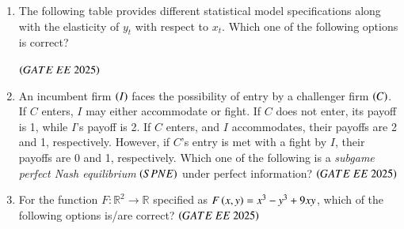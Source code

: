 \documentclass[journal,12pt,onecolumn]{IEEEtran}
\theoremstyle{remark}
\begin{document}
\begin{enumerate}
\item The following table provides different statistical model specifications along with the elasticity of $y_t$ with respect to $x_t$. Which one of the following options is correct?

\begin{center}

\end{center}
\hfill $\left(GATE\ EE\ 2025\right)$
\begin{enumerate}
\end{enumerate}
 
\item An incumbent firm $\left(I\right)$ faces the possibility of entry by a challenger firm $\left(C\right)$. If $C$ enters, $I$ may either accommodate or fight. If $C$ does not enter, its payoff is 1, while $I$'s payoff is 2. If $C$ enters, and $I$ accommodates, their payoffs are 2 and 1, respectively. However, if $C$'s entry is met with a fight by $I$, their payoffs are 0 and 1, respectively. Which one of the following is a \textit{subgame perfect Nash equilibrium} $\left(SPNE\right)$ under perfect information?
\hfill $\left(GATE\ EE\ 2025\right)$
\begin{enumerate}
\end{enumerate}
 
\item For the function $F: \mathbb{R}^2 \to \mathbb{R}$ specified as $F\left(x, y\right) = x^3 - y^3 + 9xy$, which of the following options is/are correct?
\hfill $\left(GATE\ EE\ 2025\right)$
\begin{enumerate}
\end{enumerate}
 

\end{enumerate}
\end{document}
